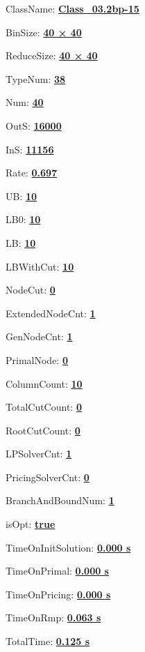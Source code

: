 \documentclass[11pt]{article}
\begin{document}
\pagestyle{empty}


ClassName: \underline{\textbf{Class_03.2bp-15}}
\par
BinSize: \underline{\textbf{40 × 40}}
\par
ReduceSize: \underline{\textbf{40 × 40}}
\par
TypeNum: \underline{\textbf{38}}
\par
Num: \underline{\textbf{40}}
\par
OutS: \underline{\textbf{16000}}
\par
InS: \underline{\textbf{11156}}
\par
Rate: \underline{\textbf{0.697}}
\par
UB: \underline{\textbf{10}}
\par
LB0: \underline{\textbf{10}}
\par
LB: \underline{\textbf{10}}
\par
LBWithCut: \underline{\textbf{10}}
\par
NodeCut: \underline{\textbf{0}}
\par
ExtendedNodeCnt: \underline{\textbf{1}}
\par
GenNodeCnt: \underline{\textbf{1}}
\par
PrimalNode: \underline{\textbf{0}}
\par
ColumnCount: \underline{\textbf{10}}
\par
TotalCutCount: \underline{\textbf{0}}
\par
RootCutCount: \underline{\textbf{0}}
\par
LPSolverCnt: \underline{\textbf{1}}
\par
PricingSolverCnt: \underline{\textbf{0}}
\par
BranchAndBoundNum: \underline{\textbf{1}}
\par
isOpt: \underline{\textbf{true}}
\par
TimeOnInitSolution: \underline{\textbf{0.000 s}}
\par
TimeOnPrimal: \underline{\textbf{0.000 s}}
\par
TimeOnPricing: \underline{\textbf{0.000 s}}
\par
TimeOnRmp: \underline{\textbf{0.063 s}}
\par
TotalTime: \underline{\textbf{0.125 s}}
\par
\newpage


\end{document}
